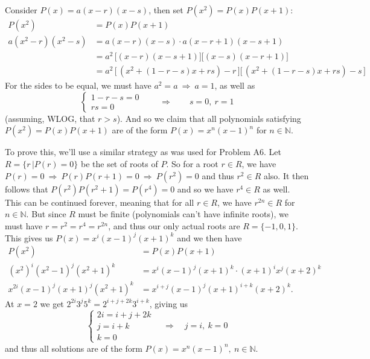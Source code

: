 \begin{solution}
    Consider \(P(x) = a(x-r)(x-s)\), then set \(P(x^2)=P(x)P(x+1)\):
    \begin{align*}
        P(x^2) &= P(x)P(x+1)\\
        a(x^2-r)(x^2-s) &= a(x-r)(x-s)\cdot a(x-r+1)(x-s+1)\\
                    &=  a^2\, \big[(x-r)(x-s+1)\big]\big[(x-s)(x-r+1)\big]\\
                    &= a^2\,\big[\, (x^2+(1-r-s)x+rs)-r\, \big]\big[\, (x^2+(1-r-s)x+rs)-s\, \big]
    \end{align*}
    For the sides to be equal, we must have $a^2=a \ \Rightarrow \ a=1$, as well as
    \[
    \begin{cases}
        1-r-s=0\\rs=0
    \end{cases}
    \qquad \Rightarrow \qquad
    s=0,\ r=1
    \]
    (assuming, WLOG, that $r>s$). And so we claim that all polynomials satisfying \( P(x^2) = P(x)P(x+1) \) are of the form \( P(x) = x^n(x-1)^n \) for \(n\in\mathbb{N}\).

    To prove this, we'll use a similar strategy as was used for Problem A6. Let $R = \{ r \, | P(r) = 0 \}$ be the set of roots of $P$. So for a root $r\in R$, we have \(P(r) = 0\ \Rightarrow \ P(r)P(r+1)=0 \ \Rightarrow \ P(r^2)=0\) and thus $r^2 \in R$ also. It then follows that \( P(r^2)P(r^2+1)=P(r^4)=0 \) and so we have \( r^4 \in R\) as well. This can be continued forever, meaning that for all $r \in R$, we have $r^{2n} \in R$ for $n \in \mathbb{N}$. But since $R$ must be finite (polynomials can't have infinite roots), we must have \(r=r^2=r^4=r^{2n}\), and thus our only actual roots are $R=\{-1,0,1\}$. This gives us \(P(x)=x^i (x-1)^j (x+1)^k\) and we then have
    \begin{align*}
        P(x^2)&=P(x)P(x+1)\\
        (x^2)^i (x^2-1)^j (x^2+1)^k &= x^i(x-1)^j(x+1)^k\cdot(x+1)^ix^j(x+2)^k\\
        x^{2i}(x-1)^j(x+1)^j(x^2+1)^k &= x^{i+j}(x-1)^j(x+1)^{i+k}(x+2)^k.
    \end{align*}
    At $x=2$ we get \(2^{2i}3^j5^k=2^{i+j+2k}3^{i+k}\), giving us
    \[
        \begin{cases}
            2i=i+j+2k\\
            j=i+k\\
            k=0
        \end{cases}
        \quad \Rightarrow \quad
        j = i, \ k = 0
    \]
    and thus all solutions are of the form \(P(x)=x^n(x-1)^n,\ n\in\mathbb{N}\).
\end{solution}

